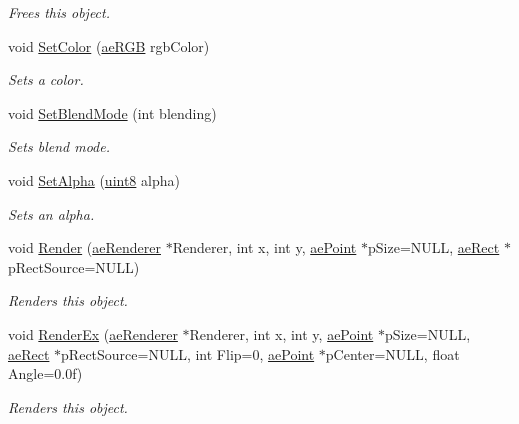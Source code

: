 \begin{DoxyCompactItemize}
\begin{DoxyCompactList}\small\item\em Frees this object. \end{DoxyCompactList}\item 
void \hyperlink{classae_core_1_1ae_sprite_aad4b4308c569dadfed99de71bd921978}{Set\+Color} (\hyperlink{structae_core_1_1ae_r_g_b}{ae\+R\+GB} rgb\+Color)
\begin{DoxyCompactList}\small\item\em Sets a color. \end{DoxyCompactList}\item 
void \hyperlink{classae_core_1_1ae_sprite_ad980068b083f6fc02cb87d8be4fa40f5}{Set\+Blend\+Mode} (int blending)
\begin{DoxyCompactList}\small\item\em Sets blend mode. \end{DoxyCompactList}\item 
void \hyperlink{classae_core_1_1ae_sprite_a926c9e48628fbc48eb5566d4ed61e474}{Set\+Alpha} (\hyperlink{namespaceae_core_aa13093dc911869e5b24942552898f01f}{uint8} alpha)
\begin{DoxyCompactList}\small\item\em Sets an alpha. \end{DoxyCompactList}\item 
void \hyperlink{classae_core_1_1ae_sprite_a192f6b1813ee98b22ddbba28a81406d3}{Render} (\hyperlink{classae_core_1_1ae_renderer}{ae\+Renderer} $\ast$Renderer, int x, int y, \hyperlink{structae_core_1_1ae_point}{ae\+Point} $\ast$p\+Size=N\+U\+LL, \hyperlink{structae_core_1_1ae_rect}{ae\+Rect} $\ast$p\+Rect\+Source=N\+U\+LL)
\begin{DoxyCompactList}\small\item\em Renders this object. \end{DoxyCompactList}\item 
void \hyperlink{classae_core_1_1ae_sprite_a369bf559adcd3e29b0afd99c24db5b3f}{Render\+Ex} (\hyperlink{classae_core_1_1ae_renderer}{ae\+Renderer} $\ast$Renderer, int x, int y, \hyperlink{structae_core_1_1ae_point}{ae\+Point} $\ast$p\+Size=N\+U\+LL, \hyperlink{structae_core_1_1ae_rect}{ae\+Rect} $\ast$p\+Rect\+Source=N\+U\+LL, int Flip=0, \hyperlink{structae_core_1_1ae_point}{ae\+Point} $\ast$p\+Center=N\+U\+LL, float Angle=0.\+0f)
\begin{DoxyCompactList}\small\item\em Renders this object. \end{DoxyCompactList}\item 

\end{DoxyCompactItemize}
